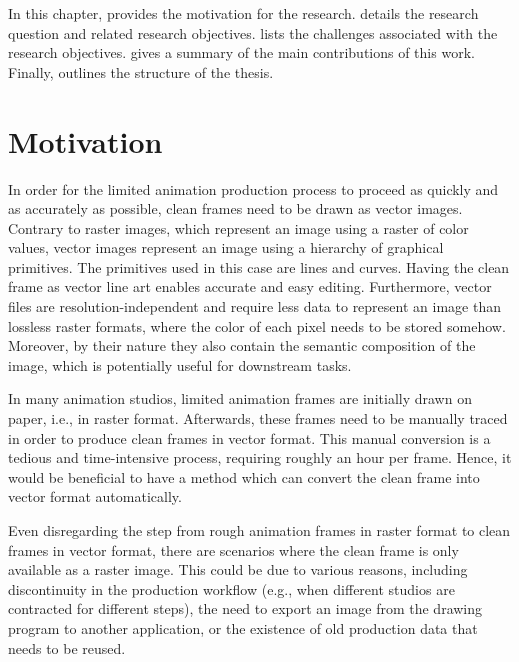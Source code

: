 In this chapter,  provides the motivation for the research. 
 details the research question and related research objectives.  lists the challenges associated with the research objectives.  gives a summary of the main contributions of this work. Finally,  outlines the structure of the thesis.

\section{Motivation}
\label{sec:motivation}

In order for the limited animation production process to proceed as quickly and as accurately as possible, clean frames need to be drawn as vector images. Contrary to raster images, which represent an image using a raster of color values, vector images represent an image using a hierarchy of graphical primitives. The primitives used in this case are lines and curves. Having the clean frame as vector line art enables accurate and easy editing. Furthermore, vector files are resolution-independent and require less data to represent an image than lossless raster formats, where the color of each pixel needs to be stored somehow. Moreover, by their nature they also contain the semantic composition of the image, which is potentially useful for downstream tasks.

In many animation studios, limited animation frames are initially drawn on paper, i.e., in raster format. Afterwards, these frames need to be manually traced in order to produce clean frames in vector format. This manual conversion is a tedious and time-intensive process, requiring roughly an hour per frame. Hence, it would be beneficial to have a method which can convert the clean frame into vector format automatically.

Even disregarding the step from rough animation frames in raster format to clean frames in vector format, there are scenarios where the clean frame is only available as a raster image. This could be due to various reasons, including discontinuity in the production workflow (e.g., when different studios are contracted for different steps), the need to export an image from the drawing program to another application, or the existence of old production data that needs to be reused.

